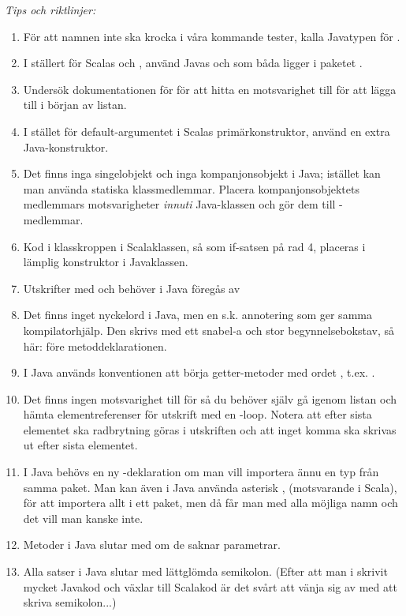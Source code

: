 \emph{Tips och riktlinjer:}
\begin{enumerate}
\item För att namnen inte ska krocka i våra kommande tester, kalla Javatypen för . 
\item  I ställert för Scalas  och , använd Javas  och  som båda ligger i paketet . 
\item Undersök dokumentationen för  för att hitta en motsvarighet till  för att lägga till i början av listan.
\item I stället för default-argumentet i Scalas primärkonstruktor, använd en extra Java-konstruktor. 
\item Det finns inga singelobjekt och inga kompanjonsobjekt i Java; istället kan man använda statiska klassmedlemmar. Placera kompanjonsobjektets medlemmars motsvarigheter \emph{innuti} Java-klassen och gör dem till -medlemmar.
\item Kod i klasskroppen i Scalaklassen, så som if-satsen på rad 4, placeras i lämplig konstruktor i Javaklassen.
\item Utskrifter med  och  behöver i Java föregås av 
\item Det finns inget nyckelord  i Java, men en s.k. annotering som ger samma kompilatorhjälp. Den skrivs med ett snabel-a och stor begynnelsebokstav, så här:   före metoddeklarationen.
\item I Java används konventionen att börja getter-metoder med ordet , t.ex. .
\item Det finns ingen motsvarighet till  för  så du behöver själv gå igenom listan och hämta elementreferenser för utskrift med en -loop. Notera att efter sista elementet ska radbrytning göras i utskriften och att inget komma ska skrivas ut efter sista elementet.
\item I Java behövs en ny -deklaration om man vill importera ännu en typ från samma paket. Man kan även i Java använda asterisk \code{*}, (motsvarande \code{_} i Scala), för att importera allt i ett paket, men då får man med alla möjliga namn och det vill man kanske inte.
\item Metoder i Java slutar med \code{()} om de saknar parametrar. 
\item Alla satser i Java slutar med lättglömda semikolon. (Efter att man i skrivit mycket Javakod och växlar till Scalakod är det svårt att vänja sig av med att skriva semikolon...)
\end{enumerate}


